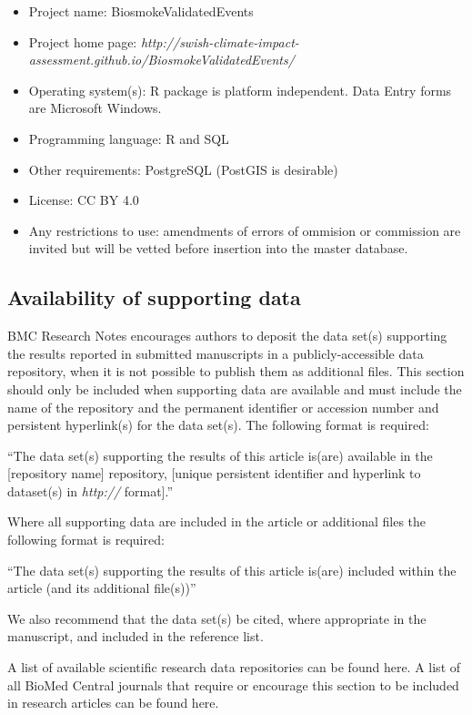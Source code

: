 \begin{itemize}
\itemsep1pt\parskip0pt
\item
  Project name: BiosmokeValidatedEvents
\item
  Project home page:
  \emph{http://swish-climate-impact-assessment.github.io/BiosmokeValidatedEvents/}
\item
  Operating system(s): R package is platform independent. Data Entry
  forms are Microsoft Windows.
\item
  Programming language: R and SQL
\item
  Other requirements: PostgreSQL (PostGIS is desirable)
\item
  License: CC BY 4.0
\item
  Any restrictions to use: amendments of errors of ommision or
  commission are invited but will be vetted before insertion into the
  master database.
\end{itemize}

\subsection{Availability of supporting
data}\label{availability-of-supporting-data}

BMC Research Notes encourages authors to deposit the data set(s)
supporting the results reported in submitted manuscripts in a
publicly-accessible data repository, when it is not possible to publish
them as additional files. This section should only be included when
supporting data are available and must include the name of the
repository and the permanent identifier or accession number and
persistent hyperlink(s) for the data set(s). The following format is
required:

``The data set(s) supporting the results of this article is(are)
available in the {[}repository name{]} repository, {[}unique persistent
identifier and hyperlink to dataset(s) in \emph{http://} format{]}.''

Where all supporting data are included in the article or additional
files the following format is required:

``The data set(s) supporting the results of this article is(are)
included within the article (and its additional file(s))''

We also recommend that the data set(s) be cited, where appropriate in
the manuscript, and included in the reference list.

A list of available scientific research data repositories can be found
here. A list of all BioMed Central journals that require or encourage
this section to be included in research articles can be found here.


